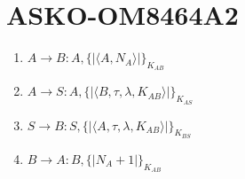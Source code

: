 \section{ASKO-OM8464A2}

\begin{enumerate}
    \item $A \rightarrow B : A, \{| \langle   A,N_A \rangle|\}_{K_{AB}}$
    \item $A \rightarrow S : A, \{|\langle B, \tau, \lambda, K_{AB} \rangle |\}_{K_{AS}}$
    \item $S \rightarrow B : S, \{|\langle A, \tau, \lambda, K_{AB} \rangle |\}_{K_{BS}}$
    \item $B \rightarrow A : B, \{|N_A+1|\}_{K{_{AB}}}$
\end{enumerate}